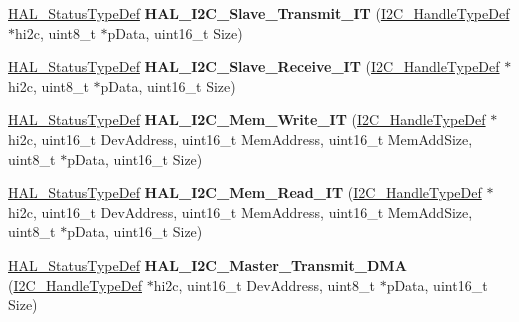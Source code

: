 \begin{DoxyCompactItemize}
\item 
\hyperlink{stm32f4xx__hal__def_8h_a63c0679d1cb8b8c684fbb0632743478f}{H\+A\+L\+\_\+\+Status\+Type\+Def} {\bfseries H\+A\+L\+\_\+\+I2\+C\+\_\+\+Slave\+\_\+\+Transmit\+\_\+\+IT} (\hyperlink{struct_i2_c___handle_type_def}{I2\+C\+\_\+\+Handle\+Type\+Def} $\ast$hi2c, uint8\+\_\+t $\ast$p\+Data, uint16\+\_\+t Size)\hypertarget{group___i2_c___exported___functions___group2_gabb5814408402b2e9d07c0b414e64fc9d}{}\label{group___i2_c___exported___functions___group2_gabb5814408402b2e9d07c0b414e64fc9d}

\item 
\hyperlink{stm32f4xx__hal__def_8h_a63c0679d1cb8b8c684fbb0632743478f}{H\+A\+L\+\_\+\+Status\+Type\+Def} {\bfseries H\+A\+L\+\_\+\+I2\+C\+\_\+\+Slave\+\_\+\+Receive\+\_\+\+IT} (\hyperlink{struct_i2_c___handle_type_def}{I2\+C\+\_\+\+Handle\+Type\+Def} $\ast$hi2c, uint8\+\_\+t $\ast$p\+Data, uint16\+\_\+t Size)\hypertarget{group___i2_c___exported___functions___group2_ga48113a4abed4b32ac19da51babb530eb}{}\label{group___i2_c___exported___functions___group2_ga48113a4abed4b32ac19da51babb530eb}

\item 
\hyperlink{stm32f4xx__hal__def_8h_a63c0679d1cb8b8c684fbb0632743478f}{H\+A\+L\+\_\+\+Status\+Type\+Def} {\bfseries H\+A\+L\+\_\+\+I2\+C\+\_\+\+Mem\+\_\+\+Write\+\_\+\+IT} (\hyperlink{struct_i2_c___handle_type_def}{I2\+C\+\_\+\+Handle\+Type\+Def} $\ast$hi2c, uint16\+\_\+t Dev\+Address, uint16\+\_\+t Mem\+Address, uint16\+\_\+t Mem\+Add\+Size, uint8\+\_\+t $\ast$p\+Data, uint16\+\_\+t Size)\hypertarget{group___i2_c___exported___functions___group2_gab57ffc32b01392d8bcce3c7ec32b3120}{}\label{group___i2_c___exported___functions___group2_gab57ffc32b01392d8bcce3c7ec32b3120}

\item 
\hyperlink{stm32f4xx__hal__def_8h_a63c0679d1cb8b8c684fbb0632743478f}{H\+A\+L\+\_\+\+Status\+Type\+Def} {\bfseries H\+A\+L\+\_\+\+I2\+C\+\_\+\+Mem\+\_\+\+Read\+\_\+\+IT} (\hyperlink{struct_i2_c___handle_type_def}{I2\+C\+\_\+\+Handle\+Type\+Def} $\ast$hi2c, uint16\+\_\+t Dev\+Address, uint16\+\_\+t Mem\+Address, uint16\+\_\+t Mem\+Add\+Size, uint8\+\_\+t $\ast$p\+Data, uint16\+\_\+t Size)\hypertarget{group___i2_c___exported___functions___group2_ga2274a9d894a1dc783bc647f937200f65}{}\label{group___i2_c___exported___functions___group2_ga2274a9d894a1dc783bc647f937200f65}

\item 
\hyperlink{stm32f4xx__hal__def_8h_a63c0679d1cb8b8c684fbb0632743478f}{H\+A\+L\+\_\+\+Status\+Type\+Def} {\bfseries H\+A\+L\+\_\+\+I2\+C\+\_\+\+Master\+\_\+\+Transmit\+\_\+\+D\+MA} (\hyperlink{struct_i2_c___handle_type_def}{I2\+C\+\_\+\+Handle\+Type\+Def} $\ast$hi2c, uint16\+\_\+t Dev\+Address, uint8\+\_\+t $\ast$p\+Data, uint16\+\_\+t Size)\hypertarget{group___i2_c___exported___functions___group2_ga978126d41a3a67384f4cb2fe3e6e7e8f}{}\label{group___i2_c___exported___functions___group2_ga978126d41a3a67384f4cb2fe3e6e7e8f}


\end{DoxyCompactItemize}
